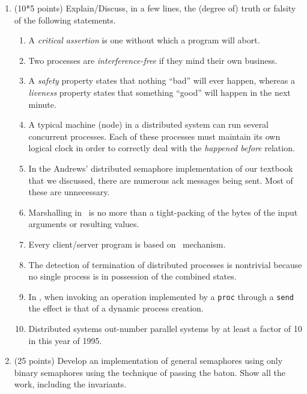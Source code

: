 \begin{enumerate}

\item (10*5 points)
Explain/Discuss, in a few lines, the (degree of) truth or falsity of
the following statements.

\begin{enumerate}
\item A {\em critical assertion} is one without which a program will abort.

\item Two processes are {\em interference-free} if they mind their
own business.

\item A {\em safety} property states that nothing ``bad'' will ever happen,
whereas a {\em liveness} property states that something ``good'' will
happen in the next minute.

\item
A typical machine (node) in a distributed system can run several
concurrent processes.  Each of these processes must maintain its own
logical clock in order to correctly deal with the {\em happened
before} relation.

\item
In the Andrews' distributed semaphore implementation of our textbook
that we discussed, there are numerous {\sc ack} messages being sent.
Most of these are unnecessary.

\item Marshalling in \RPC\ is no more than a tight-packing
of the bytes of the input arguments or resulting values.

\item
Every client/server program is based on \RPC\ mechanism.

\item
The detection of termination of distributed processes is nontrivial
because no single process is in possession of the combined states.

\item
In \SR, when invoking an operation implemented by a {\tt proc} through
a {\tt send} the effect is that of a dynamic process creation.

\item
Distributed systems out-number parallel systems by at least a factor
of 10 in this year of 1995.
\end{enumerate}

\item (25 points)
Develop an implementation of general semaphores using only binary
semaphores using the technique of passing the baton.  Show all
the work, including the invariants.


\end{enumerate}
